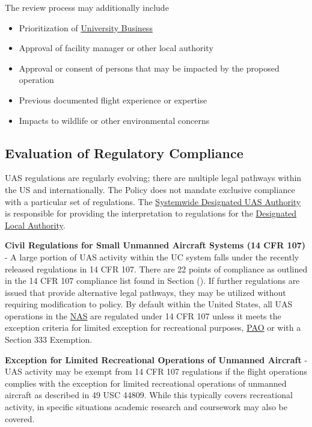 \documentclass[
]{book}
\providecommand{\tightlist}{%
  \setlength{\itemsep}{0pt}\setlength{\parskip}{0pt}}
\begin{document}
The review process may additionally include

\begin{itemize}
\tightlist
\item
  Prioritization of \protect\hyperlink{UB}{University Business}
\item
  Approval of facility manager or other local authority
\item
  Approval or consent of persons that may be impacted by the proposed operation
\item
  Previous documented flight experience or expertise
\item
  Impacts to wildlife or other environmental concerns
\end{itemize}

\hypertarget{ss-regcomp}{%
\subsection{Evaluation of Regulatory Compliance}\label{ss-regcomp}}

UAS regulations are regularly evolving; there are multiple legal pathways within the US and internationally. The Policy does not mandate exclusive compliance with a particular set of regulations. The \protect\hyperlink{SDA}{Systemwide Designated UAS Authority} is responsible for providing the interpretation to regulations for the \protect\hyperlink{DLA}{Designated Local Authority}.

\textbf{Civil Regulations for Small Unmanned Aircraft Systems (14 CFR 107)} - A large portion of UAS activity within the UC system falls under the recently released regulations in 14 CFR 107. There are 22 points of compliance as outlined in the 14 CFR 107 compliance list found in Section (). If further regulations are issued that provide alternative legal pathways, they may be utilized without requiring modification to policy. By default within the United States, all UAS operations in the \protect\hyperlink{NAS}{NAS} are regulated under 14 CFR 107 unless it meets the exception criteria for limited exception for recreational purposes, \protect\hyperlink{PAO}{PAO} or with a Section 333 Exemption.

\textbf{Exception for Limited Recreational Operations of Unmanned Aircraft} - UAS activity may be exempt from 14 CFR 107 regulations if the flight operations complies with the exception for limited recreational operations of unmanned aircraft as described in 49 USC 44809. While this typically covers recreational activity, in specific situations academic research and coursework may also be covered.
\end{document}
